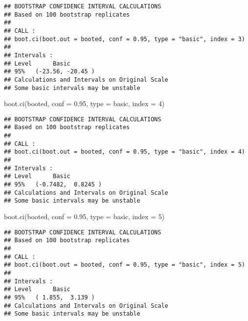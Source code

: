 \documentclass[
]{book}
\newenvironment{Shaded}{\begin{snugshade}}{\end{snugshade}}
\newcommand{\AttributeTok}[1]{\textcolor[rgb]{0.77,0.63,0.00}{#1}}
\newcommand{\DecValTok}[1]{\textcolor[rgb]{0.00,0.00,0.81}{#1}}
\newcommand{\FloatTok}[1]{\textcolor[rgb]{0.00,0.00,0.81}{#1}}
\newcommand{\FunctionTok}[1]{\textcolor[rgb]{0.00,0.00,0.00}{#1}}
\newcommand{\NormalTok}[1]{#1}
\newcommand{\StringTok}[1]{\textcolor[rgb]{0.31,0.60,0.02}{#1}}
\begin{document}
\begin{verbatim}
## BOOTSTRAP CONFIDENCE INTERVAL CALCULATIONS
## Based on 100 bootstrap replicates
## 
## CALL : 
## boot.ci(boot.out = booted, conf = 0.95, type = "basic", index = 3)
## 
## Intervals : 
## Level      Basic         
## 95%   (-23.56, -20.45 )  
## Calculations and Intervals on Original Scale
## Some basic intervals may be unstable
\end{verbatim}

\begin{Shaded}
\begin{Highlighting}[]
\FunctionTok{boot.ci}\NormalTok{(booted, }\AttributeTok{conf =} \FloatTok{0.95}\NormalTok{, }\AttributeTok{type =} \StringTok{\textquotesingle{}basic\textquotesingle{}}\NormalTok{, }\AttributeTok{index =} \DecValTok{4}\NormalTok{)}
\end{Highlighting}
\end{Shaded}

\begin{verbatim}
## BOOTSTRAP CONFIDENCE INTERVAL CALCULATIONS
## Based on 100 bootstrap replicates
## 
## CALL : 
## boot.ci(boot.out = booted, conf = 0.95, type = "basic", index = 4)
## 
## Intervals : 
## Level      Basic         
## 95%   (-0.7482,  0.8245 )  
## Calculations and Intervals on Original Scale
## Some basic intervals may be unstable
\end{verbatim}

\begin{Shaded}
\begin{Highlighting}[]
\FunctionTok{boot.ci}\NormalTok{(booted, }\AttributeTok{conf =} \FloatTok{0.95}\NormalTok{, }\AttributeTok{type =} \StringTok{\textquotesingle{}basic\textquotesingle{}}\NormalTok{, }\AttributeTok{index =} \DecValTok{5}\NormalTok{)}
\end{Highlighting}
\end{Shaded}

\begin{verbatim}
## BOOTSTRAP CONFIDENCE INTERVAL CALCULATIONS
## Based on 100 bootstrap replicates
## 
## CALL : 
## boot.ci(boot.out = booted, conf = 0.95, type = "basic", index = 5)
## 
## Intervals : 
## Level      Basic         
## 95%   ( 1.855,  3.139 )  
## Calculations and Intervals on Original Scale
## Some basic intervals may be unstable
\end{verbatim}

  
\end{document}
